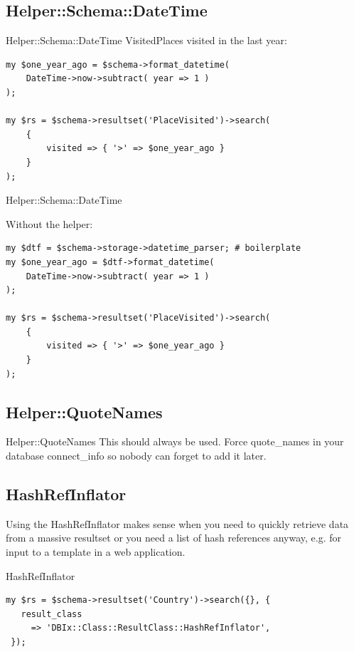 \subsection{Helper::Schema::DateTime}

\begin{frame}[fragile]{Helper::Schema::DateTime}
VisitedPlaces visited in the last year:

\begin{lstlisting}
my $one_year_ago = $schema->format_datetime(
    DateTime->now->subtract( year => 1 )
);

my $rs = $schema->resultset('PlaceVisited')->search(
    {
        visited => { '>' => $one_year_ago }
    }
);
\end{lstlisting}
\end{frame}

\begin{frame}[fragile]{Helper::Schema::DateTime}

Without the helper:

\begin{lstlisting}
my $dtf = $schema->storage->datetime_parser; # boilerplate
my $one_year_ago = $dtf->format_datetime(
    DateTime->now->subtract( year => 1 )
);

my $rs = $schema->resultset('PlaceVisited')->search(
    {
        visited => { '>' => $one_year_ago }
    }
);
\end{lstlisting}
\end{frame}

\subsection{Helper::QuoteNames}

\begin{frame}{Helper::QuoteNames}
This should always be used. Force quote\_names in your database
connect\_info so nobody can forget to add it later.
\end{frame}

\subsection{HashRefInflator}

Using the HashRefInflator makes sense when you need to quickly retrieve
data from a massive resultset or you need a list of hash references anyway,
e.g. for input to a template in a web application.

\begin{frame}[fragile]{HashRefInflator}
\begin{lstlisting}
my $rs = $schema->resultset('Country')->search({}, {
   result_class
     => 'DBIx::Class::ResultClass::HashRefInflator',
 });
\end{lstlisting}
\end{frame}

